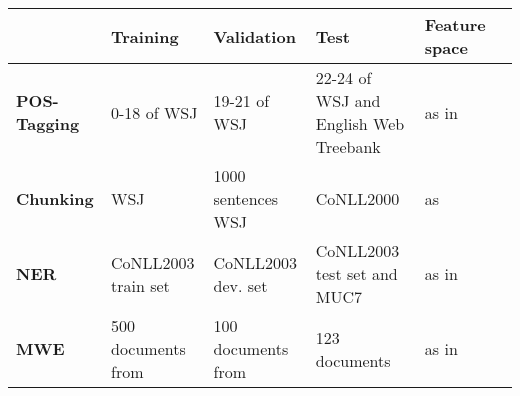 \documentclass[11pt]{article}
\begin{document}
\begin{table*}
\begin{small}
\begin{tabular}{lllp{3cm}ll}
			& Training & Validation & Test & Feature space \\ \hline
\textbf{POS-Tagging} & 0-18 of WSJ & 19-21 of WSJ & 22-24 of WSJ and English Web Treebank & as in~\cite{collobert2011natural} \\
\textbf{Chunking} & WSJ & 1000 sentences WSJ & CoNLL2000 & as~\cite{turian2010word}\\
\textbf{NER} & CoNLL2003 train set & CoNLL2003 dev. set & CoNLL2003 test set and MUC7 & as in~\cite{turian2010word} \\
\textbf{MWE} & 500 documents from & 100 documents from & 123 documents & as in~\cite{mwecorpus}\\
\hline
\end{tabular}
\end{small}
\end{table*}




\end{document}
